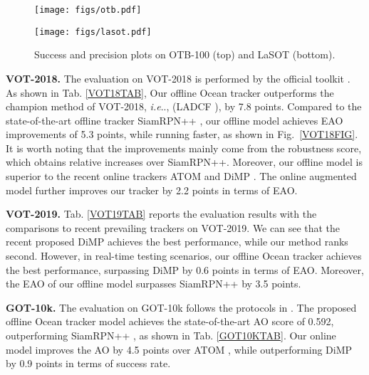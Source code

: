 \documentclass[runningheads]{llncs}
\makeatletter
\DeclareRobustCommand\onedot{\futurelet\@let@token\@onedot}
\def\@onedot{\ifx\@let@token.\else.\null\fi\xspace}
\def\ie{\emph{i.e}\onedot} \def\Ie{\emph{I.e}\onedot}
\makeatother
\begin{document}
\begin{wrapfigure}{r}{0.6\textwidth}
	
	\centering
	\begin{minipage}[c]{8cm}
\hspace{-1.5em}
		\texttt{[image: figs/otb.pdf]}
	\end{minipage}\hfill
	\vspace{-1em}
	\begin{minipage}[c]{8cm}
		\hspace{-1.5em}
\texttt{[image: figs/lasot.pdf]}
	\end{minipage}\hfill
	\begin{minipage}[c]{7cm}
		\vspace{-1em}
		\caption{Success and precision plots on OTB-100 \cite{OTB-2015} (top) and LaSOT \cite{LASOT} (bottom).}
		\label{OTBFIG}
	\end{minipage}

	\vspace{-2em}
\end{wrapfigure}

\noindent\textbf{VOT-2018.} The evaluation on VOT-2018 is performed by the official toolkit \cite{VOT-2018}. As shown in Tab. \ref{VOT18TAB}, Our offline Ocean tracker outperforms the champion method of VOT-2018, \ie, (LADCF \cite{LADCF}), by 7.8 points. Compared to the state-of-the-art offline tracker SiamRPN++ \cite{SiamRPN++}, our offline model achieves EAO improvements of 5.3 points, while running faster, as shown in Fig.~\ref{VOT18FIG}. 
It is worth noting that the improvements mainly come from the robustness score, which obtains  relative increases over SiamRPN++. Moreover, our offline model is  superior to the recent online trackers ATOM \cite{ATOM} and DiMP \cite{DiMP}. The online augmented model further improves our tracker by 2.2 points in terms of EAO.



\noindent\textbf{VOT-2019.} Tab. \ref{VOT19TAB} reports the evaluation results with the comparisons to recent prevailing trackers on VOT-2019. 
We can see that the recent proposed DiMP \cite{DiMP} achieves the best performance, while our method ranks second. However, in real-time testing scenarios, our offline Ocean tracker achieves the best performance, surpassing DiMP by 0.6 points in terms of EAO. Moreover, the EAO of our offline model surpasses SiamRPN++ \cite{SiamRPN++} by 3.5 points.



\noindent\textbf{GOT-10k.} The evaluation on GOT-10k follows the protocols in \cite{GOT10K}. The proposed offline Ocean tracker model achieves the state-of-the-art AO score of 0.592, outperforming SiamRPN++ \cite{SiamRPN++}, as shown in Tab. \ref{GOT10KTAB}. Our online model improves the AO by 4.5 points over ATOM \cite{ATOM}, while outperforming DiMP~\cite{DiMP} by 0.9 points in terms of success rate.
\end{document}

